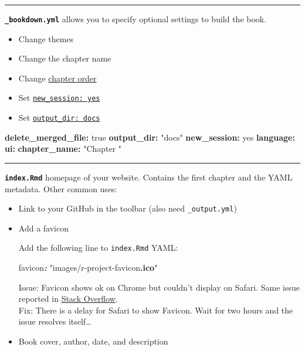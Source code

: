 \documentclass[
]{book}
\newenvironment{Shaded}{\begin{snugshade}}{\end{snugshade}}
\newcommand{\AttributeTok}[1]{\textcolor[rgb]{0.13,0.29,0.53}{#1}}
\newcommand{\CharTok}[1]{\textcolor[rgb]{0.31,0.60,0.02}{#1}}
\newcommand{\FunctionTok}[1]{\textcolor[rgb]{0.13,0.29,0.53}{\textbf{#1}}}
\newcommand{\InformationTok}[1]{\textcolor[rgb]{0.56,0.35,0.01}{\textbf{\textit{#1}}}}
\newcommand{\KeywordTok}[1]{\textcolor[rgb]{0.13,0.29,0.53}{\textbf{#1}}}
\newcommand{\NormalTok}[1]{#1}
\newcommand{\StringTok}[1]{\textcolor[rgb]{0.31,0.60,0.02}{#1}}
\providecommand{\tightlist}{%
  \setlength{\itemsep}{0pt}\setlength{\parskip}{0pt}}
\theoremstyle{definition}
\theoremstyle{definition}
\theoremstyle{definition}
\theoremstyle{definition}
\theoremstyle{remark}
\begin{document}
\begin{center}\rule{0.5\linewidth}{0.5pt}\end{center}

\textbf{\texttt{\_bookdown.yml}} allows you to specify optional settings to build the book.

\begin{itemize}
\tightlist
\item
  Change themes
\item
  Change the chapter name
\item
  Change \href{https://rstudio4edu.github.io/rstudio4edu-book/book-yours.html\#book-order}{chapter order}
\item
  Set \href{https://rstudio4edu.github.io/rstudio4edu-book/make-book.html\#book-output}{\texttt{new\_session:\ yes}}
\item
  Set \href{https://rstudio4edu.github.io/rstudio4edu-book/make-book.html\#book-output}{\texttt{output\_dir:\ docs}}
\end{itemize}

\begin{Shaded}
\begin{Highlighting}[]
\FunctionTok{delete\_merged\_file}\KeywordTok{:}\AttributeTok{ }\CharTok{true}
\FunctionTok{output\_dir}\KeywordTok{:}\AttributeTok{ }\StringTok{"docs"}
\FunctionTok{new\_session}\KeywordTok{:}\AttributeTok{ }\CharTok{yes}
\FunctionTok{language}\KeywordTok{:}
\AttributeTok{  }\FunctionTok{ui}\KeywordTok{:}
\AttributeTok{    }\FunctionTok{chapter\_name}\KeywordTok{:}\AttributeTok{ }\StringTok{"Chapter "}
\end{Highlighting}
\end{Shaded}

\begin{center}\rule{0.5\linewidth}{0.5pt}\end{center}

\textbf{\texttt{index.Rmd}} {homepage of your website}. Contains the first chapter and the YAML metadata. Other common uses:

\begin{itemize}
\item
  Link to your GitHub in the toolbar (also need \texttt{\_output.yml})
\item
  Add a favicon

  Add the following line to \texttt{index.Rmd} YAML:

\begin{Shaded}
\begin{Highlighting}[]
\NormalTok{favicon}\InformationTok{:}\NormalTok{ "images/r{-}project{-}favicon}\FunctionTok{.ico}\NormalTok{"}
\end{Highlighting}
\end{Shaded}

  Issue: Favicon shows ok on Chrome but couldn't display on Safari. Same issue reported in \href{https://stackoverflow.com/questions/66023588/r-bookdown-favicon-works-offline-but-not-online}{Stack Overflow}.\\
  Fix: There is a delay for Safari to show Favicon. Wait for two hours and the issue resolves itself\ldots{}
\item
  Book cover, author, date, and description
\end{itemize}
\end{document}
